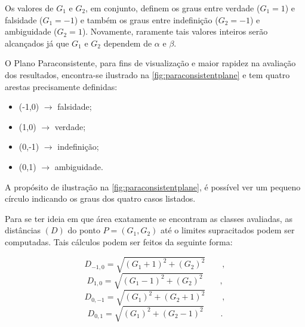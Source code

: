 			\par Os valores de $G_1$ e $G_2$, em conjunto, definem os graus entre verdade ($G_1=1$) e falsidade ($G_1=-1$) e também os graus entre indefinição ($G_2=-1$) e ambiguidade ($G_2=1$). Novamente, raramente tais valores inteiros serão alcançados já que $G_1$ e $G_2$ dependem de $\alpha$ e $\beta$.
	
			\par O Plano Paraconsistente, para fins de visualização e maior rapidez na avaliação dos resultados, encontra-se ilustrado na  \autoref{fig:paraconsistentplane} e tem quatro arestas precisamente definidas:
			\begin{itemize}
				\item (-1,0) $\rightarrow$ falsidade;
				\item (1,0) $\rightarrow$ verdade;
				\item (0,-1) $\rightarrow$ indefinição;
				\item (0,1) $\rightarrow$ ambiguidade.
			\end{itemize}
			\par A propósito de ilustração na  \autoref{fig:paraconsistentplane}, é possível ver um pequeno círculo indicando os graus dos quatro casos listados.
			
			\par Para se ter ideia em que área exatamente se encontram as classes avaliadas, as distâncias $(D)$ do ponto $P=(G_1,G_2)$ até o limites supracitados podem ser computadas. Tais cálculos podem ser feitos da seguinte forma:
	
			\begin{equation}
				D_{-1,0}=\sqrt{(G_1+1)^2+(G_2)^2}\qquad,
			\end{equation}
			\begin{equation}
				D_{1,0}=\sqrt{(G_1-1)^2+(G_2)^2}\qquad,
			\end{equation}
			\begin{equation}
				D_{0,-1}=\sqrt{(G_1)^2+(G_2+1)^2}\qquad,		
			\end{equation}
			\begin{equation}
				D_{0,1}=\sqrt{(G_1)^2+(G_2-1)^2}\qquad.
			\end{equation}		
			

